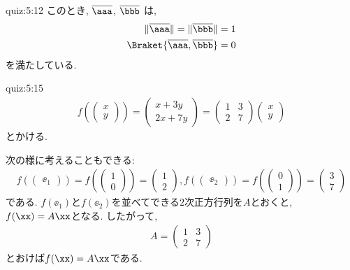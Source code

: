 \begin{answerof}{quiz:5:12}
  このとき, $\overline{\aaa}$, $\overline{\bbb}$
  は,
  \begin{align*}
    \|\overline{\aaa}\|=\|\overline{\bbb}\|=1\\
    \Braket{\overline{\aaa},\overline{\bbb}}=0
  \end{align*}
  を満たしている.
\end{answerof}


\begin{answerof}{quiz:5:15}
  \begin{align*}
    f(\begin{pmatrix}x\\y\end{pmatrix})
      =\begin{pmatrix}x+3y\\2x+7y\end{pmatrix}
      =\begin{pmatrix}1&3\\2&7\end{pmatrix}\begin{pmatrix}x\\y\end{pmatrix}
  \end{align*}
  とかける.


  次の様に考えることもできる:
  \begin{align*}
    f(\begin{pmatrix}\ee_1\end{pmatrix})
    =f(\begin{pmatrix}1\\0\end{pmatrix})
    =\begin{pmatrix}1\\2\end{pmatrix},
    f(\begin{pmatrix}\ee_2\end{pmatrix})
    =f(\begin{pmatrix}0\\1\end{pmatrix})
    =\begin{pmatrix}3\\7\end{pmatrix}
  \end{align*}
  である.
  $f(\ee_1)$と$f(\ee_2)$を並べてできる$2$次正方行列を$A$とおくと,
  $f(\xx)=A\xx$となる.
  したがって,
  \begin{align*}
    A=\begin{pmatrix}1&3\\2&7\end{pmatrix}
  \end{align*}
  とおけば$f(\xx)=A\xx$である.
\end{answerof}


